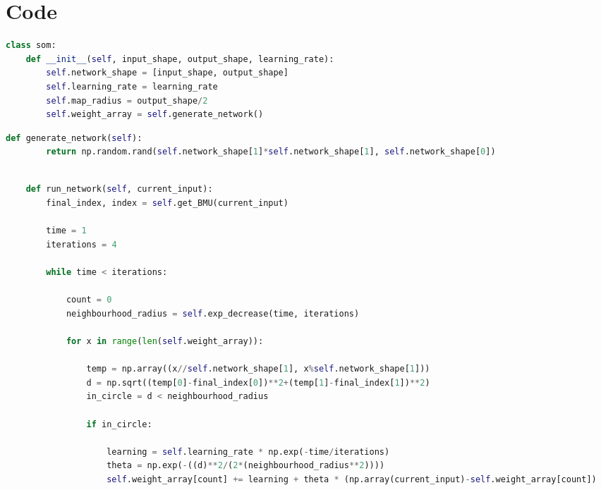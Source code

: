 \documentclass[12pt]{report} %
\begin{document}
\section{Code}
\vspace{7mm}
\begin{changemargin}{-1cm}{-1cm} 
\begin{lstlisting}[language=python, caption= {Initializing the Self Organizing Map}, captionpos=b]
class som:
    def __init__(self, input_shape, output_shape, learning_rate):
        self.network_shape = [input_shape, output_shape]
        self.learning_rate = learning_rate
        self.map_radius = output_shape/2
        self.weight_array = self.generate_network()
\end{lstlisting}


\vspace{15mm}

\begin{lstlisting}[language=python, caption= {        Given a shape of the network, generate randomized weight matrices for the network}, captionpos=b]
    def generate_network(self):
        return np.random.rand(self.network_shape[1]*self.network_shape[1], self.network_shape[0])
\end{lstlisting}

\newpage

\begin{lstlisting}[language=python, caption= {        Given a trained network and the input(s), predict the possible output; Rows in the weight matrix correspond to nodes of the next layer; whereas columns correspond to nodes of the previous layer }, captionpos=b]

    def run_network(self, current_input):
        final_index, index = self.get_BMU(current_input)

        time = 1
        iterations = 4

        while time < iterations:

            count = 0
            neighbourhood_radius = self.exp_decrease(time, iterations)

            for x in range(len(self.weight_array)):

                temp = np.array((x//self.network_shape[1], x%self.network_shape[1])) 
                d = np.sqrt((temp[0]-final_index[0])**2+(temp[1]-final_index[1])**2)
                in_circle = d < neighbourhood_radius

                if in_circle:

                    learning = self.learning_rate * np.exp(-time/iterations)
                    theta = np.exp(-((d)**2/(2*(neighbourhood_radius**2))))
                    self.weight_array[count] += learning + theta * (np.array(current_input)-self.weight_array[count])


\end{lstlisting}
\end{changemargin}
\end{document}
